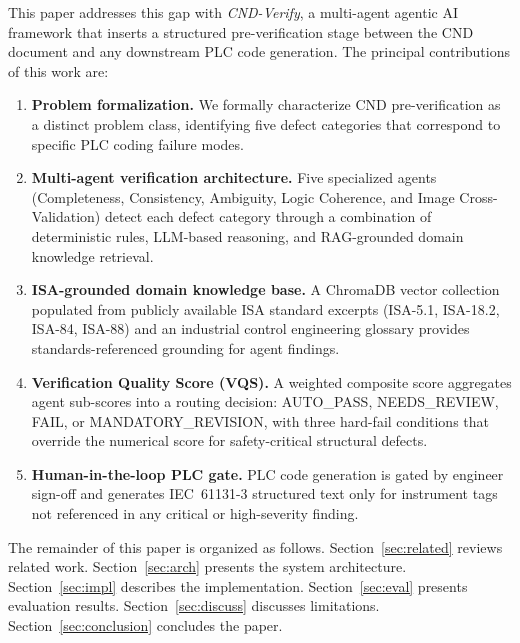 \documentclass[journal]{IEEEtran}
\newcommand{\sys}{\textit{CND-Verify}}
\begin{document}
This paper addresses this gap with \sys{}, a multi-agent agentic AI framework
that inserts a structured pre-verification stage between the CND document and
any downstream PLC code generation. The principal contributions of this work
are:

\begin{enumerate}
  \item \textbf{Problem formalization.} We formally characterize CND
  pre-verification as a distinct problem class, identifying five defect
  categories that correspond to specific PLC coding failure modes.

  \item \textbf{Multi-agent verification architecture.} Five specialized agents
  (Completeness, Consistency, Ambiguity, Logic Coherence, and Image
  Cross-Validation) detect each defect category through a combination of
  deterministic rules, LLM-based reasoning, and RAG-grounded domain knowledge
  retrieval.

  \item \textbf{ISA-grounded domain knowledge base.} A ChromaDB vector
  collection populated from publicly available ISA standard excerpts
  (ISA-5.1, ISA-18.2, ISA-84, ISA-88) and an industrial control engineering
  glossary provides standards-referenced grounding for agent findings.

  \item \textbf{Verification Quality Score (VQS).} A weighted composite score
  aggregates agent sub-scores into a routing decision: AUTO\_PASS, NEEDS\_REVIEW,
  FAIL, or MANDATORY\_REVISION, with three hard-fail conditions that override the
  numerical score for safety-critical structural defects.

  \item \textbf{Human-in-the-loop PLC gate.} PLC code generation is gated by
  engineer sign-off and generates IEC~61131-3 structured text only for
  instrument tags not referenced in any critical or high-severity finding.
\end{enumerate}

The remainder of this paper is organized as follows. Section~\ref{sec:related}
reviews related work. Section~\ref{sec:arch} presents the system architecture.
Section~\ref{sec:impl} describes the implementation. Section~\ref{sec:eval}
presents evaluation results. Section~\ref{sec:discuss} discusses limitations.
Section~\ref{sec:conclusion} concludes the paper.

\end{document}
